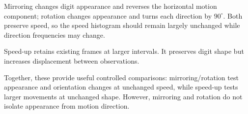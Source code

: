 Mirroring changes digit appearance and reverses the horizontal motion component; rotation changes appearance and turns each direction by $90^\circ$. Both preserve speed, so the speed histogram should remain largely unchanged while direction frequencies may change.

Speed-up retains existing frames at larger intervals. It preserves digit shape but increases displacement between observations.

Together, these provide useful controlled comparisons: mirroring/rotation test appearance and orientation changes at unchanged speed, while speed-up tests larger movements at unchanged shape. However, mirroring and rotation do not isolate appearance from motion direction.
